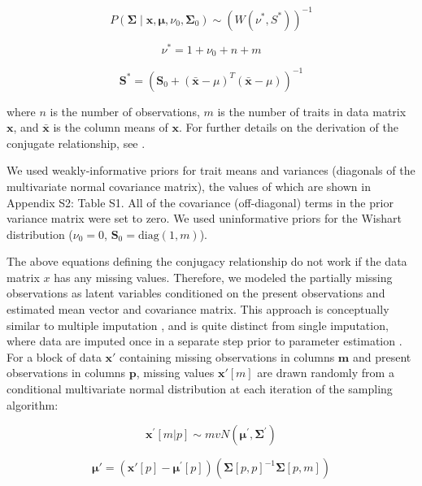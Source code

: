 \documentclass{article}
\begin{document}
\begin{equation}
P(\bm{\Sigma} \mid
\bm{x}, \bm{\mu},
\nu_0, \bm{\Sigma}_0)
\sim
(W(\nu^*, S^*))^{-1}
\end{equation}

\begin{equation}
\nu^* = 1 + \nu_0 + n + m
\end{equation}

\begin{equation}
\bm{S^*} = (\bm{S}_0 + (\bar{\bm{x}} - \mu)^T (\bar{\bm{x}} - \mu))^{-1}
\end{equation}

where $n$ is the number of observations, $m$ is the number of traits in data matrix $\bm{x}$, and $\bar{\bm{x}}$ is the column means of $\bm{x}$.
For further details on the derivation of the conjugate relationship, see \citet[Section 3.6, "Multivariate normal with unknown mean and variance", pg. 72]{gelman_2003_bayesian}.

We used weakly-informative priors for trait means and variances (diagonals of the multivariate normal covariance matrix), the values of which are shown in Appendix S2: Table S1.
All of the covariance (off-diagonal) terms in the prior variance matrix were set to zero.
We used uninformative priors for the Wishart distribution ($\nu_0 = 0$, $\bm{S}_0 = \mathrm{diag}(1, m)$).

The above equations defining the conjugacy relationship do not work if the data matrix $x$ has any missing values.
Therefore, we modeled the partially missing observations as latent variables conditioned on the present observations and estimated mean vector and covariance matrix.
This approach is conceptually similar to multiple imputation \citep{white_2010_multiple,graham_2009_missing_data_analysis},
and is quite distinct from single imputation, where data are imputed once in a separate step prior to parameter estimation \citep{white_2010_multiple,graham_2009_missing_data_analysis}.
For a block of data $\bm{x\prime}$ containing missing observations in columns $\bm{m}$ and present observations in columns $\bm{p}$,
missing values $\bm{x\prime}[m]$ are drawn randomly from a conditional multivariate normal distribution at each iteration of the sampling algorithm:

\begin{equation}
\bm{x^\prime}[m|p] \sim mvN(\bm{\mu}^\prime, \bm{\Sigma}^\prime)
\end{equation}

\begin{equation}
\bm{\mu\prime} =
(\bm{x\prime}[p] - \bm{\mu^\prime}[p])
(\bm{\Sigma}[p,p]^{-1} \bm{\Sigma}[p,m])
\end{equation}
\end{document}
